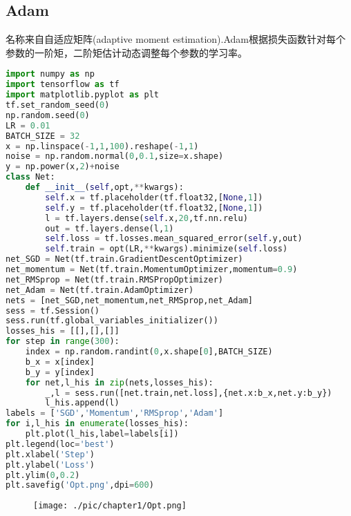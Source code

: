 \subsection{Adam}
名称来自自适应矩阵(adaptive moment estimation).Adam根据损失函数针对每个参数的一阶矩，二阶矩估计动态调整每个参数的学习率。
\begin{lstlisting}[language=Python]
import numpy as np
import tensorflow as tf
import matplotlib.pyplot as plt
tf.set_random_seed(0)
np.random.seed(0)
LR = 0.01
BATCH_SIZE = 32
x = np.linspace(-1,1,100).reshape(-1,1)
noise = np.random.normal(0,0.1,size=x.shape)
y = np.power(x,2)+noise
class Net:
    def __init__(self,opt,**kwargs):
        self.x = tf.placeholder(tf.float32,[None,1])
        self.y = tf.placeholder(tf.float32,[None,1])
        l = tf.layers.dense(self.x,20,tf.nn.relu)
        out = tf.layers.dense(l,1)
        self.loss = tf.losses.mean_squared_error(self.y,out)
        self.train = opt(LR,**kwargs).minimize(self.loss)
net_SGD = Net(tf.train.GradientDescentOptimizer)
net_momentum = Net(tf.train.MomentumOptimizer,momentum=0.9)
net_RMSprop = Net(tf.train.RMSPropOptimizer)
net_Adam = Net(tf.train.AdamOptimizer)
nets = [net_SGD,net_momentum,net_RMSprop,net_Adam]
sess = tf.Session()
sess.run(tf.global_variables_initializer())
losses_his = [[],[],[]]
for step in range(300):
    index = np.random.randint(0,x.shape[0],BATCH_SIZE)
    b_x = x[index]
    b_y = y[index]
    for net,l_his in zip(nets,losses_his):
        _,l = sess.run([net.train,net.loss],{net.x:b_x,net.y:b_y})
        l_his.append(l)
labels = ['SGD','Momentum','RMSprop','Adam']
for i,l_his in enumerate(losses_his):
    plt.plot(l_his,label=labels[i])
plt.legend(loc='best')
plt.xlabel('Step')
plt.ylabel('Loss')
plt.ylim(0,0.2)
plt.savefig('Opt.png',dpi=600)
\end{lstlisting}
\begin{figure}[H]
	\centering
	\texttt{[image: ./pic/chapter1/Opt.png]}
\end{figure}
